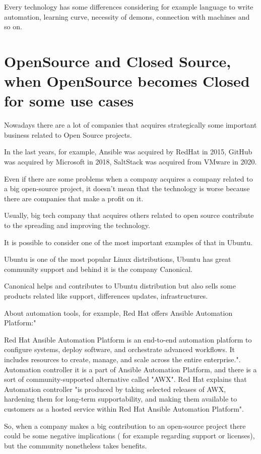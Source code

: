 \documentclass[12pt,a4paper,openright,twoside]{book}
\begin{document}
Every technology has some differences considering for example language to write automation, learning curve, necessity of demons, connection with machines and so on.

\section{OpenSource and Closed Source, when OpenSource becomes Closed for some use cases}
Nowadays there are a lot of companies that acquires strategically some important business related to Open Source projects.


In the last years, for example, Ansible was acquired by RedHat in 2015, GitHub was acquired by Microsoft in 2018, SaltStack was acquired from VMware in 2020.


Even if there are some problems when a company acquires a company related to a big open-source project, it doesn't mean that the technology is worse because there are companies that make a profit on it.

Usually, big tech company that acquires others related to open source contribute to the spreading and improving the technology.


It is possible to consider one of the most important examples of that in Ubuntu.


Ubuntu is one of the most popular Linux distributions, Ubuntu has great community support and behind it is the company Canonical.


Canonical helps and contributes to Ubuntu distribution but also sells some products related like support, differences updates, infrastructures.

About automation tools, for example, Red Hat offers Ansible Automation Platform:"


Red Hat Ansible Automation Platform is an end-to-end automation platform to configure systems, deploy software, and orchestrate advanced workflows. It includes resources to create, manage, and scale across the entire enterprise."\cite{ansibleAutomationPlatform}.
Automation controller it is a part of Ansible Automation Platform, and there is a sort of community-supported alternative called "AWX"\cite{ansibleAwxAAP}.
Red Hat explains that Automation controller "is produced by taking selected releases of AWX, hardening them for long-term supportability, and making them available to customers as a hosted service within Red Hat Ansible Automation Platform"\cite{ansibleFaq}.

So, when a company makes a big contribution to an open-source project there could be some negative implications ( for example regarding support or licenses), but the community nonetheless takes benefits.
\end{document}
